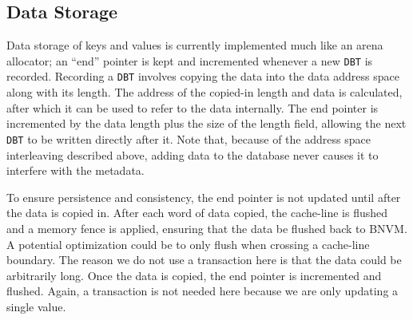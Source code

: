 \subsection{Data Storage}
\label{sec:ds}

Data storage of keys and values is currently implemented much like an arena
allocator; an ``end'' pointer is kept and incremented whenever a new \texttt{DBT} is
recorded. Recording a \texttt{DBT} involves copying the data into the data
address space along with its length. The address of the copied-in length and
data is calculated, after which it can be used to refer to the data internally.
The end pointer is incremented by the data length plus the size of the length
field, allowing the next \texttt{DBT} to be written directly after it. Note
that, because of the address space interleaving described above, adding data to
the database never causes it to interfere with the metadata.

To ensure persistence and consistency, the end pointer is not updated until
after the data is copied in. After each word of data copied, the cache-line
is flushed and a memory fence is applied, ensuring that the data be flushed back
to BNVM. A potential optimization could be to only flush when crossing a
cache-line boundary. The reason we do not use a transaction here is that the
data could be arbitrarily long. Once the data is copied, the end pointer is
incremented and flushed. Again, a transaction is not needed here because we are
only updating a single value.




